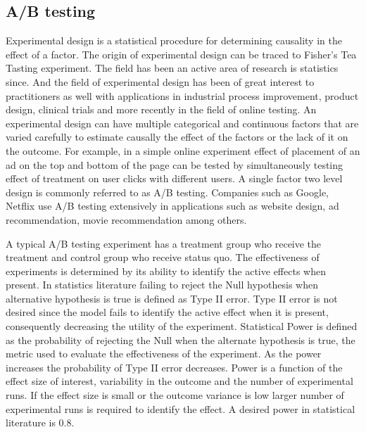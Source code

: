 \documentclass[letterpaper,11pt]{article}
\begin{document}
\subsection{A/B testing}
Experimental design is a statistical procedure for determining causality in the effect of a factor. The origin of experimental design can be traced to Fisher's Tea Tasting experiment. The field has been an active area of research is statistics since. And the field of experimental design has been of great interest to practitioners as well with applications in industrial process improvement, product design, clinical trials and more recently in the field of online testing. An experimental design can have multiple categorical and continuous factors that are varied carefully to estimate causally the effect of the factors or the lack of it on the outcome. For example, in a simple online experiment effect of placement of an ad on the top and bottom of the page can be tested by simultaneously testing effect of treatment on user clicks with different users. A single factor two level design is commonly referred to as A/B testing. Companies such as Google, Netflix use A/B testing extensively in applications such as website design, ad recommendation, movie recommendation among others. 

A typical A/B testing experiment has a treatment group who receive the treatment and control group who receive status quo. The effectiveness of experiments is determined by its ability to identify the active effects when present. In statistics literature failing to reject the Null hypothesis when alternative hypothesis is true is defined as Type II error. Type II error is not desired since the model fails to identify the active effect when it is present, consequently decreasing the utility of the experiment. Statistical Power is defined as the probability of rejecting the Null when the alternate hypothesis is true, the metric used to evaluate the effectiveness of the experiment. As the power increases the probability of Type II error decreases. Power is a function of the effect size of interest, variability in the outcome and the number of experimental runs. If the effect size is small or the outcome variance is low larger number of experimental runs is required to identify the effect. A desired power in statistical literature is 0.8.              
\end{document}
